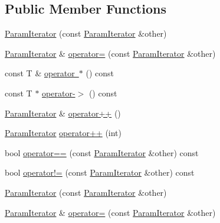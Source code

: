 \subsection*{Public Member Functions}
\begin{DoxyCompactItemize}
\item 
\mbox{\hyperlink{classtesting_1_1internal_1_1_param_iterator_aa10585055ee055e304703a3004f24f33}{Param\+Iterator}} (const \mbox{\hyperlink{classtesting_1_1internal_1_1_param_iterator}{Param\+Iterator}} \&other)
\item 
\mbox{\hyperlink{classtesting_1_1internal_1_1_param_iterator}{Param\+Iterator}} \& \mbox{\hyperlink{classtesting_1_1internal_1_1_param_iterator_a8019f54ea1c66ca39ffdec47acfabfe6}{operator=}} (const \mbox{\hyperlink{classtesting_1_1internal_1_1_param_iterator}{Param\+Iterator}} \&other)
\item 
const T \& \mbox{\hyperlink{classtesting_1_1internal_1_1_param_iterator_aa024380a4cc0cfdcaa114e942c348fce}{operator $\ast$}} () const
\item 
const T $\ast$ \mbox{\hyperlink{classtesting_1_1internal_1_1_param_iterator_aad035d35e8f0c1412854959a94d4887e}{operator-\/$>$}} () const
\item 
\mbox{\hyperlink{classtesting_1_1internal_1_1_param_iterator}{Param\+Iterator}} \& \mbox{\hyperlink{classtesting_1_1internal_1_1_param_iterator_ab0922f2f554fb3beaf13c442da605e8d}{operator++}} ()
\item 
\mbox{\hyperlink{classtesting_1_1internal_1_1_param_iterator}{Param\+Iterator}} \mbox{\hyperlink{classtesting_1_1internal_1_1_param_iterator_af51e17827dd54977165937550c0fb030}{operator++}} (int)
\item 
bool \mbox{\hyperlink{classtesting_1_1internal_1_1_param_iterator_adc356b4789eb0c2a1b5b033c7874e5a6}{operator==}} (const \mbox{\hyperlink{classtesting_1_1internal_1_1_param_iterator}{Param\+Iterator}} \&other) const
\item 
bool \mbox{\hyperlink{classtesting_1_1internal_1_1_param_iterator_a7a6aee04e8e44b5c8294929951cfac2b}{operator!=}} (const \mbox{\hyperlink{classtesting_1_1internal_1_1_param_iterator}{Param\+Iterator}} \&other) const
\item 
\mbox{\hyperlink{classtesting_1_1internal_1_1_param_iterator_aa10585055ee055e304703a3004f24f33}{Param\+Iterator}} (const \mbox{\hyperlink{classtesting_1_1internal_1_1_param_iterator}{Param\+Iterator}} \&other)
\item 
\mbox{\hyperlink{classtesting_1_1internal_1_1_param_iterator}{Param\+Iterator}} \& \mbox{\hyperlink{classtesting_1_1internal_1_1_param_iterator_a8019f54ea1c66ca39ffdec47acfabfe6}{operator=}} (const \mbox{\hyperlink{classtesting_1_1internal_1_1_param_iterator}{Param\+Iterator}} \&other)

\end{DoxyCompactItemize}
